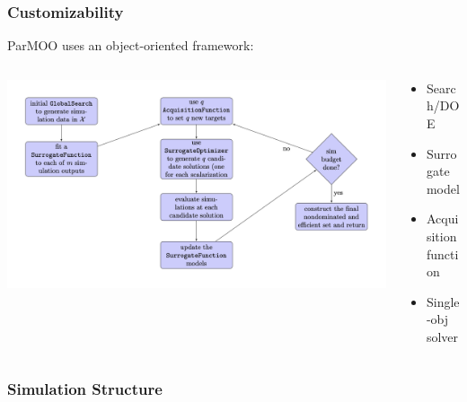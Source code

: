 \documentclass[aspectratio=169]{beamer}
\begin{document}
\begin{frame}\frametitle{Customizability}
ParMOO uses an object-oriented framework:\\
\begin{columns}
\begin{column}{0.7\textwidth}
\includegraphics[width=\textwidth]{algorithm-flowchart.png}
\end{column}
\begin{column}{0.3\textwidth}
\pause
\begin{itemize}
\item Search/DOE
\item Surrogate model
\item Acquisition function
\item Single-obj solver
\end{itemize}
\end{column}
\end{columns}
\end{frame}

\begin{frame}\frametitle{Simulation Structure}
\begin{center}

\vskip -2in

\end{center}
\end{frame}
\end{document}
